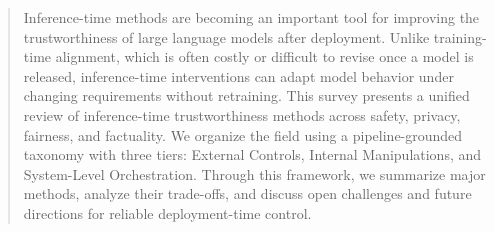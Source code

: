 \begin{abstract}
  Inference-time methods are becoming an important tool for improving the trustworthiness of large language models after deployment. Unlike training-time alignment, which is often costly or difficult to revise once a model is released, inference-time interventions can adapt model behavior under changing requirements without retraining. This survey presents a unified review of inference-time trustworthiness methods across safety, privacy, fairness, and factuality. We organize the field using a pipeline-grounded taxonomy with three tiers: External Controls, Internal Manipulations, and System-Level Orchestration. Through this framework, we summarize major methods, analyze their trade-offs, and discuss open challenges and future directions for reliable deployment-time control.
\end{abstract}